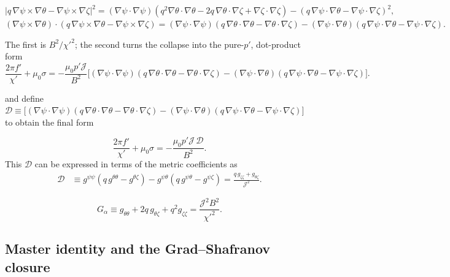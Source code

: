 \documentclass[10pt,a4paper]{article}
\numberwithin{equation}{section}
\begin{document}
$|q\,\nabla\psi\times\nabla\theta-\nabla\psi\times\nabla\zeta|^2=(\nabla\psi\cdot\nabla\psi)(q^2\nabla\theta\cdot\nabla\theta-2q\,\nabla\theta\cdot\nabla\zeta+\nabla\zeta\cdot\nabla\zeta)
-(q\,\nabla\psi\cdot\nabla\theta-\nabla\psi\cdot\nabla\zeta)^2,$
$(\nabla\psi\times\nabla\theta)\cdot(q\,\nabla\psi\times\nabla\theta-\nabla\psi\times\nabla\zeta)=(\nabla\psi\cdot\nabla\psi)(q\,\nabla\theta\cdot\nabla\theta-\nabla\theta\cdot\nabla\zeta)
-(\nabla\psi\cdot\nabla\theta)(q\,\nabla\psi\cdot\nabla\theta-\nabla\psi\cdot\nabla\zeta).$

The first is $B^2/\chi'^2$; the second turns the collapse into the pure-$p'$, dot-product form
\begin{equation}
\frac{2\pi f'}{\chi'}+\mu_0\sigma
=-\frac{\mu_0p'\mathcal J}{B^2}
\big[(\nabla\psi\cdot\nabla\psi)(q\,\nabla\theta\cdot\nabla\theta-\nabla\theta\cdot\nabla\zeta)
-(\nabla\psi\cdot\nabla\theta)(q\,\nabla\psi\cdot\nabla\theta-\nabla\psi\cdot\nabla\zeta)\big].
\end{equation}

and define $\mathcal D\equiv\big[(\nabla\psi\cdot\nabla\psi)(q\,\nabla\theta\cdot\nabla\theta-\nabla\theta\cdot\nabla\zeta)
-(\nabla\psi\cdot\nabla\theta)(q\,\nabla\psi\cdot\nabla\theta-\nabla\psi\cdot\nabla\zeta)\big]$ to obtain the final form

\begin{equation}
\frac{2\pi f'}{\chi'}+\mu_0\sigma=-\frac{\mu_0p'\mathcal J\,\mathcal D}{B^2}.
\end{equation}
This $\mathcal D$ can be expressed in terms of the metric coefficients as
\begin{equation}
\begin{aligned}
\mathcal D
&\equiv g^{\psi\psi}(q\,g^{\theta\theta}-g^{\theta\zeta})
-g^{\psi\theta}(q\,g^{\psi\theta}-g^{\psi\zeta})=\frac{q\,g_{\zeta\zeta}+g_{\theta\zeta}}{\mathcal J^2}.
\end{aligned}
\end{equation}

\begin{equation}
G_\alpha\equiv g_{\theta\theta}+2q\,g_{\theta\zeta}+q^2g_{\zeta\zeta}=\frac{\mathcal J^2B^2}{\chi'^2}.
\end{equation}

\subsection{Master identity and the Grad--Shafranov closure}
\label{app:master}
\end{document}
